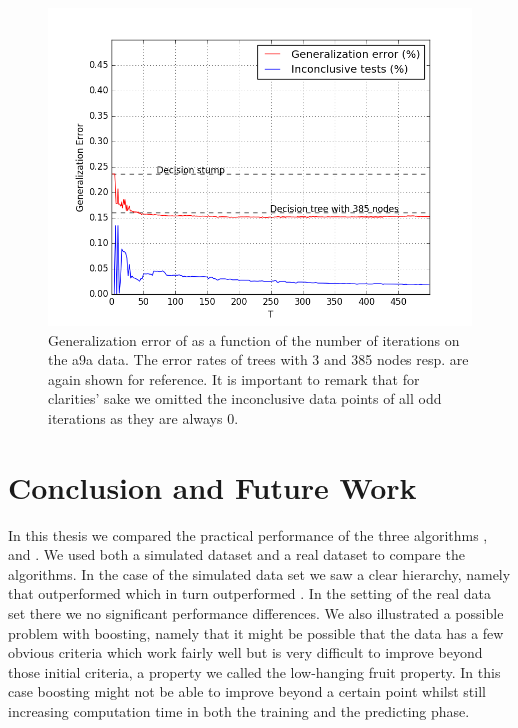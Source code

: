 \begin{figure}[!ht]
  \centering
    \includegraphics[width=\graphWidth]{generated/SQSVM.png}
  \caption{Generalization error of \squintB as a function of the number of iterations on the a9a data. The error rates of trees with 3 and 385 nodes resp. are again shown for reference. It is important to remark that for clarities' sake we omitted the inconclusive data points of all odd iterations as they are always 0.}
      \label{fig:SQSVM}
\end{figure}
\FloatBarrier

 
\chapter{Conclusion and Future Work} 
\label{sec:Concl}

In this thesis we compared the practical performance of the three algorithms \adaB, \NHB and \squintB.  We used both a simulated dataset and a real dataset to compare the algorithms. In the case of the simulated data set we saw a clear hierarchy, namely that \NHB outperformed \adaB which in turn outperformed \squintB. In the setting of the real data set  there we no significant performance differences.
We also illustrated a possible problem with boosting, namely that it might be possible that the data has a few obvious criteria which work fairly well but is very difficult to improve beyond those initial criteria, a property we called the low-hanging fruit property. In this case boosting might not be able to improve beyond a certain point whilst still increasing computation time in both the training and the predicting phase. 

